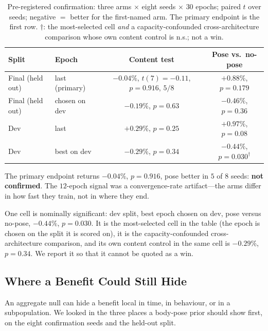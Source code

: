 \documentclass{article} %
\begin{document}
\begin{table}[t]
\caption{Pre-registered confirmation: three arms $\times$ eight seeds $\times$
$30$ epochs; paired $t$ over seeds; negative $=$ better for the first-named arm.
The primary endpoint is the first row. $\dagger$: the most-selected cell \emph{and}
a capacity-confounded cross-architecture comparison whose own content control is
n.s.; not a win.}
\label{tab:confirm}
\begin{center}
\footnotesize
\begin{tabular}{llcc}
\toprule
Split & Epoch & Content test & Pose vs.\ no-pose \\
\midrule
Final (held out) & last (primary) & $-0.04\%$, $t(7){=}-0.11$, $p{=}0.916$, $5/8$ & $+0.88\%$, $p{=}0.179$ \\
Final (held out) & chosen on dev  & $-0.19\%$, $p{=}0.63$ & $-0.46\%$, $p{=}0.36$ \\
Dev              & last           & $+0.29\%$, $p{=}0.25$ & $+0.97\%$, $p{=}0.08$ \\
Dev              & best on dev    & $-0.29\%$, $p{=}0.34$ & $-0.44\%$, $p{=}0.030^{\dagger}$ \\
\bottomrule
\end{tabular}
\end{center}
\end{table}

The primary endpoint returns $-0.04\%$, $p{=}0.916$, pose better in $5$ of $8$
seeds: \textbf{not confirmed}. The $12$-epoch signal was a convergence-rate
artifact---the arms differ in how fast they train, not in where they end.

One cell is nominally significant: dev split, best epoch chosen on dev, pose
versus no-pose, $-0.44\%$, $p{=}0.030$. It is the most-selected cell in the table
(the epoch is chosen on the split it is scored on), it is the capacity-confounded
cross-architecture comparison, and its own content control in the same cell is
$-0.29\%$, $p{=}0.34$. We report it so that it cannot be quoted as a win.

\subsection{Where a Benefit Could Still Hide}
\label{sec:res_hide}

An aggregate null can hide a benefit local in time, in behaviour, or in a
subpopulation. We looked in the three places a body-pose prior should show first,
on the eight confirmation seeds and the held-out split.
\end{document}
